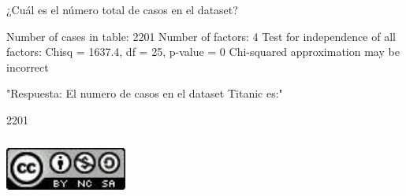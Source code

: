 \documentclass{report}
\begin{document}
\newpage

¿Cuál es el número total de casos en el dataset?

\begin{Schunk}
\begin{Soutput}
Number of cases in table: 2201 
Number of factors: 4 
Test for independence of all factors:
	Chisq = 1637.4, df = 25, p-value = 0
	Chi-squared approximation may be incorrect
\end{Soutput}
\begin{Soutput}
[1] "Respuesta: El numero de casos en el dataset Titanic es:"
\end{Soutput}
\begin{Soutput}
[1] 2201
\end{Soutput}
\end{Schunk}



\centering
\href{http://creativecommons.org/licenses/by-nc-sa/4.0/}{\includegraphics[width=4cm, height=2cm]{lic}}
\end{document}
